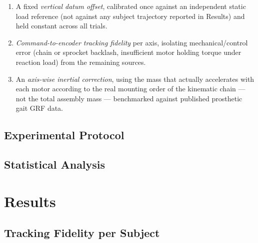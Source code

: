 \documentclass[prosthesis,article,submit,moreauthors]{Definitions/mdpi}
\begin{document}
\begin{enumerate}
\item A fixed \textit{vertical datum offset}, calibrated once against
an independent static load reference (not against any subject
trajectory reported in Results) and held constant across all trials.
\item \textit{Command-to-encoder tracking fidelity} per axis, isolating
mechanical/control error (chain or sprocket backlash, insufficient
motor holding torque under reaction load) from the remaining sources.
\item An \textit{axis-wise inertial correction}, using the mass that
actually accelerates with each motor according to the real mounting
order of the kinematic chain --- not the total assembly mass ---
benchmarked against published prosthetic gait GRF data.
\end{enumerate}

\subsection{Experimental Protocol}

\subsection{Statistical Analysis}

\section{Results}

\subsection{Tracking Fidelity per Subject}
\end{document}
